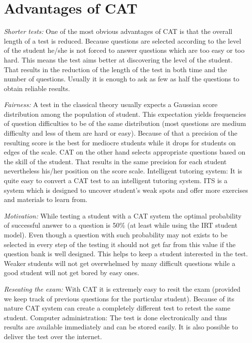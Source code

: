 \section{Advantages of CAT}
\emph{Shorter tests:} One of the most obvious advantages of CAT is that the overall length of a test is reduced. Because questions are selected according to the level of the student he/she is not forced to answer questions which are too easy or too hard. This means the test aims better at discovering the level of the student. That results in the reduction of the length of the test in both time and the number of questions. Usually it is enough to ask as few as half the questions to obtain reliable results. 

\emph{Fairness:} A test in the classical theory usually expects a Gaussian score distribution among the population of student. This expectation yields frequencies of question difficulties to be of the same distribution (most questions are medium difficulty and less of them are hard or easy). Because of that a precision of the resulting score is the best for mediocre students while it drops for students on edges of the scale. CAT on the other hand selects appropriate questions based on the skill of the student. That results in the same precision for each student nevertheless his/her position on the score scale.
Intelligent tutoring system: It is quite easy to convert a CAT test to an intelligent tutoring system. ITS is a system which is designed to uncover student’s weak spots and offer more exercises and materials to learn from.

\emph{Motivation: }While testing a student with a CAT system the optimal probability of successful answer to a question is 50\% (at least while using the IRT student model). Even though a question with such probability may not exists to be selected in every step of the testing it should not get far from this value if the question bank is well designed. This helps to keep a student interested in the test. Weaker students will not get overwhelmed by many difficult questions while a good student will not get bored by easy ones.

\emph{Reseating the exam: }With CAT it is extremely easy to resit the exam (provided we keep track of previous questions for the particular student). Because of its nature CAT system can create a completely different test to retest the same student.
Computer administration: The test is done electronically and thus results are available immediately and can be stored easily. It is also possible to deliver the test over the internet.

